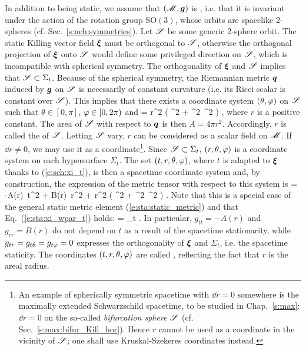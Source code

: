 In addition to being static, we assume that $(\mathscr{M},\bm{g})$ is ,
i.e. that it is invariant under the action of the rotation group $\mathrm{SO}(3)$,
whose orbits are spacelike 2-spheres (cf. Sec.~\ref{s:neh:symmetries}).
Let $\mathscr{S}$ be some generic 2-sphere orbit. The static Killing vector field $\bm{\xi}$
must be orthogonal to $\mathscr{S}$, otherwise the orthogonal projection of $\bm{\xi}$
onto $\mathscr{S}$ would define some privileged direction on $\mathscr{S}$, which is incompatible
with spherical symmetry. The orthogonality of $\bm{\xi}$ and $\mathscr{S}$ implies
that $\mathscr{S}\subset\Sigma_t$. Because of the spherical symmetry, the Riemannian
metric $\bm{q}$ induced by $\bm{g}$ on $\mathscr{S}$ is necessarily of constant curvature
(i.e. its Ricci scalar is constant over $\mathscr{S}$). This implies that there exists
a coordinate system $(\theta,\varphi)$ on
$\mathscr{S}$ such that $\theta\in[0,\pi]$, $\varphi\in[0,2\pi)$ %
and
\be
     = r^2 \left( \dd\th^2 + \sin^2\th\, \dd\ph^2 \right) ,
\ee
where $r$ is a positive constant.
The area of $\mathscr{S}$ with respect to $\bm{q}$ is then $A=4\pi r^2$. Accordingly, $r$ is called the 
of $\mathscr{S}$. Letting $\mathscr{S}$ vary, $r$ can be considered as a scalar field on
$\mathscr{M}$. If $\dd r \not = 0$, we may use it as a coordinate\footnote{An example of spherically symmetric spacetime with $\dd r = 0$ somewhere is the maximally extended Schwarzschild spacetime,
to be studied in Chap.~\ref{s:max}: $\dd r = 0$ on the so-called
\emph{bifurcation sphere} $\mathscr{S}$ (cf. Sec.~\ref{s:max:bifur_Kill_hor}). Hence $r$ cannot be used
as a coordinate in the vicinity of $\mathscr{S}$; one shall use Kruskal-Szekeres coordinates instead.}. Since $\mathscr{S}\subset \Sigma_t$,
$(r,\theta,\varphi)$ is a coordinate system on each hypersurface $\Sigma_t$.
The set $(t,r,\theta,\varphi)$,
where $t$ is adapted to $\bm{\xi}$ thanks to (\ref{e:sch:xi_t}), is then a
spacetime coordinate system and, by construction, the expression of the metric tensor
with respect to this system is
\be \label{e:sch:g_AB}
     = -A(r)\, \dd t^2 + B(r)\, \dd r^2 +
        r^2 \left( \dd\th^2 + \sin^2\th\, \dd\ph^2 \right) .
\ee
Note that this is a special case of the general static metric element
(\ref{e:sta:static_metric}) and that Eq.~(\ref{e:sta:xi_wpar_t}) holds:
\be \label{e:sch:xi_wpar_t}
    \w{\xi} = \wpar_t .
\ee
In particular, $g_{tt} = -A(r)$ and $g_{rr} = B(r)$ do not depend on $t$
as a result of the spacetime stationarity, while
$g_{tr} = g_{t\theta} = g_{t\varphi} = 0$ expresses the orthogonality of $\bm{\xi}$
and $\Sigma_t$, i.e. the spacetime staticity.
The coordinates $(t,r,\theta,\varphi)$ are called ,
reflecting the fact that $r$ is the areal radius.

